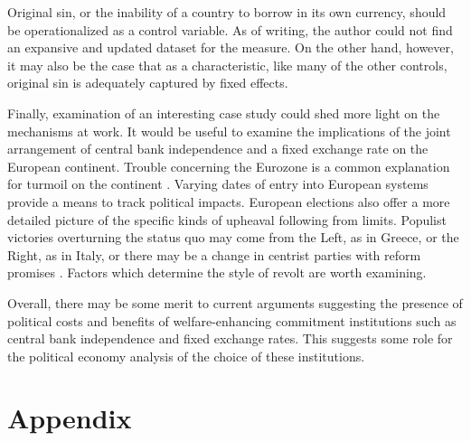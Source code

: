 \documentclass{article}
\begin{document}
    Original sin, or the inability of a country to borrow in its own currency, should be operationalized as a control variable. As of writing, the author could not find an expansive and updated dataset for the measure. On the other hand, however, it may also be the case that as a characteristic, like many of the other controls, original sin is adequately captured by fixed effects.

    Finally, examination of an interesting case study could shed more light on the mechanisms at work. It would be useful to examine the implications of the joint arrangement of central bank independence and a fixed exchange rate on the European continent. Trouble concerning the Eurozone is a common explanation for turmoil on the continent \citep{stiglitz_joseph_2016}. Varying dates of entry into European systems provide a means to track political impacts. European elections also offer a more detailed picture of the specific kinds of upheaval following from limits. Populist victories overturning the status quo may come from the Left, as in Greece, or the Right, as in Italy, or there may be a change in centrist parties with reform promises \citep{henley_how_2018}. Factors which determine the style of revolt are worth examining.

    Overall, there may be some merit to current arguments suggesting the presence of political costs and benefits of welfare-enhancing commitment institutions such as central bank independence and fixed exchange rates. This suggests some role for the political economy analysis of the choice of these institutions.
    
    \clearpage
    \newpage

    
    

    \clearpage
    \newpage

    \appendix

    \section*{Appendix}

    

    

    

    

    
\end{document}
